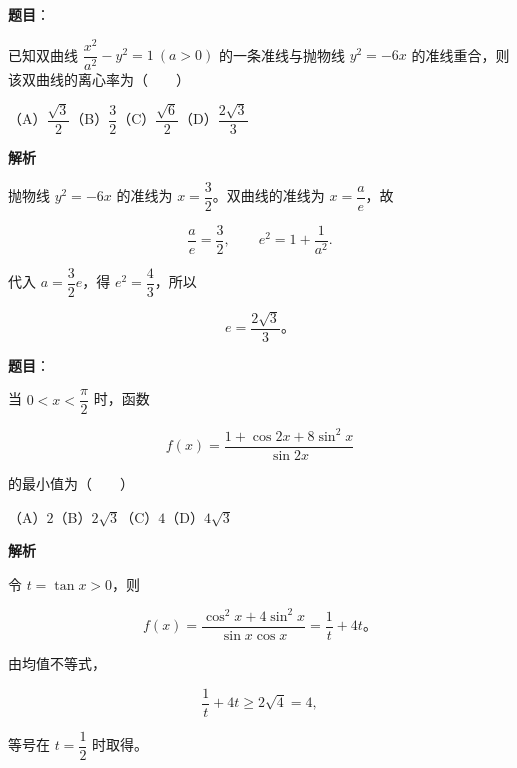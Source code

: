 \begin{answer}

\textbf{题目}：

已知双曲线 $\dfrac{x^2}{a^2}-y^2=1\ (a>0)$ 的一条准线与抛物线 $y^2=-6x$ 的准线重合，则该双曲线的离心率为\mbox{（　　）}

（A）$\dfrac{\sqrt3}{2}$\quad（B）$\dfrac32$\quad（C）$\dfrac{\sqrt6}{2}$\quad（D）$\dfrac{2\sqrt3}{3}$

\textbf{解析}

抛物线 $y^2=-6x$ 的准线为 $x=\dfrac32$。双曲线的准线为 $x=\dfrac ae$，故

\nopagebreak[4]
\[
\frac ae=\frac32,\qquad e^2=1+\frac1{a^2}.
\]

代入 $a=\dfrac32e$，得 $e^2=\dfrac43$，所以

\nopagebreak[4]
\[
e=\frac{2\sqrt3}{3}\text{。}
\]


\end{answer}
\begin{answer}

\textbf{题目}：

当 $0<x<\dfrac{\pi}{2}$ 时，函数

\nopagebreak[4]
\[
f(x)=\frac{1+\cos2x+8\sin^2x}{\sin2x}
\]

的最小值为\mbox{（　　）}

（A）$2$\quad（B）$2\sqrt3$\quad（C）$4$\quad（D）$4\sqrt3$

\textbf{解析}

令 $t=\tan x>0$，则

\nopagebreak[4]
\[
f(x)=\frac{\cos^2x+4\sin^2x}{\sin x\cos x}
=\frac1t+4t\text{。}
\]

由均值不等式，

\nopagebreak[4]
\[
\frac1t+4t\geqslant2\sqrt4=4,
\]

等号在 $t=\dfrac12$ 时取得。


\end{answer}
